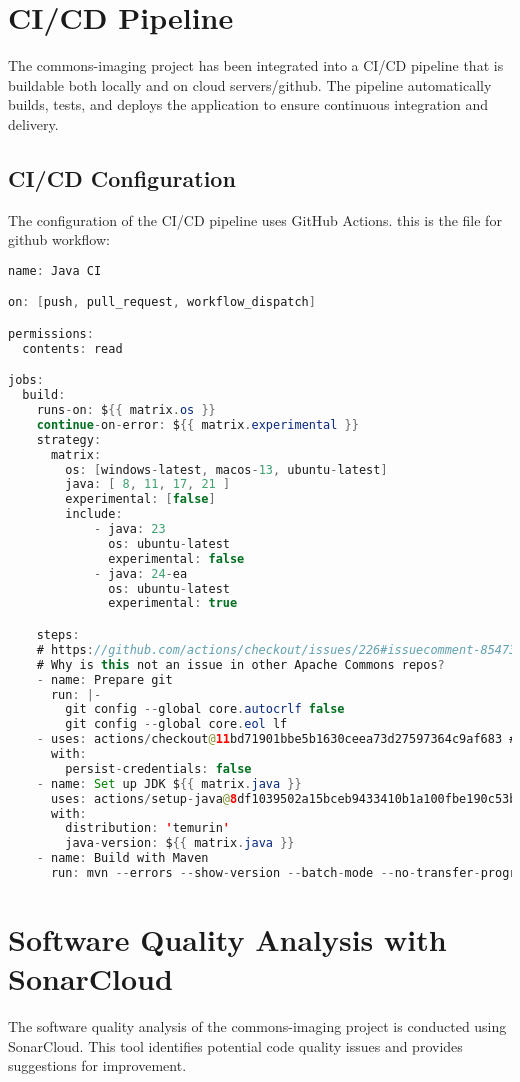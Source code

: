 \documentclass[a4paper,12pt]{report}
\begin{document}
\newpage

\chapter{CI/CD Pipeline}
The commons-imaging project has been integrated into a CI/CD pipeline that is buildable both locally and on cloud servers/github. The pipeline automatically builds, tests, and deploys the application to ensure continuous integration and delivery.

\section{CI/CD Configuration}
The configuration of the CI/CD pipeline uses GitHub Actions.
this is the file for github workflow:

\begin{lstlisting}[language=java, caption=maven.yml]
name: Java CI

on: [push, pull_request, workflow_dispatch]

permissions:
  contents: read

jobs:
  build:
    runs-on: ${{ matrix.os }}
    continue-on-error: ${{ matrix.experimental }}
    strategy:
      matrix:
        os: [windows-latest, macos-13, ubuntu-latest]
        java: [ 8, 11, 17, 21 ]
        experimental: [false]
        include:
            - java: 23
              os: ubuntu-latest
              experimental: false
            - java: 24-ea
              os: ubuntu-latest
              experimental: true

    steps:
    # https://github.com/actions/checkout/issues/226#issuecomment-854736025
    # Why is this not an issue in other Apache Commons repos?
    - name: Prepare git
      run: |-
        git config --global core.autocrlf false
        git config --global core.eol lf
    - uses: actions/checkout@11bd71901bbe5b1630ceea73d27597364c9af683 # v4.2.2
      with:
        persist-credentials: false
    - name: Set up JDK ${{ matrix.java }}
      uses: actions/setup-java@8df1039502a15bceb9433410b1a100fbe190c53b # v4.5.0
      with:
        distribution: 'temurin'
        java-version: ${{ matrix.java }}
    - name: Build with Maven
      run: mvn --errors --show-version --batch-mode --no-transfer-progress
\end{lstlisting}

\newpage

\chapter{Software Quality Analysis with SonarCloud}
The software quality analysis of the commons-imaging project is conducted using SonarCloud. This tool identifies potential code quality issues and provides suggestions for improvement.
\end{document}
